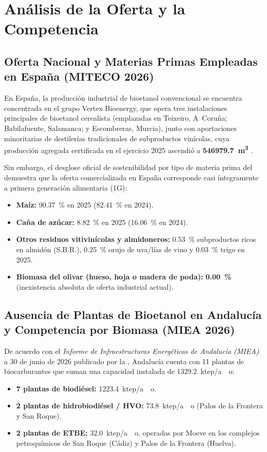 \documentclass{report}
\begin{document}
\chapter{Análisis de la Oferta y la Competencia}

\section{Oferta Nacional y Materias Primas Empleadas en España (MITECO 2026)}
En España, la producción industrial de bioetanol convencional se encuentra concentrada en el grupo Vertex Bioenergy, que opera tres instalaciones principales de bioetanol cerealista (emplazadas en Teixeiro, A~Coruña; Babilafuente, Salamanca; y Escombreras, Murcia), junto con aportaciones minoritarias de destilerías tradicionales de subproductos vinícolas, cuya producción agregada certificada en el ejercicio 2025 ascendió a \textbf{\SI{546979.7}{\cubic\meter}} \autocite{MITECO2026}.

Sin embargo, el desglose oficial de sostenibilidad por tipo de materia prima del \textcite{MITECO2026} demuestra que la oferta comercializada en España corresponde casi íntegramente a primera generación alimentaria (1G):
\begin{itemize}
    \item \textbf{Maíz:} \SI{90.37}{\percent} en 2025 (\SI{82.41}{\percent} en 2024).
    \item \textbf{Caña de azúcar:} \SI{8.82}{\percent} en 2025 (\SI{16.06}{\percent} en 2024).
    \item \textbf{Otros residuos vitivinícolas y almidoneros:} \SI{0.53}{\percent} subproductos ricos en almidón (S.B.R.), \SI{0.25}{\percent} orujo de uva/lías de vino y \SI{0.03}{\percent} trigo en 2025.
    \item \textbf{Biomasa del olivar (hueso, hoja o madera de poda):} \textbf{\SI{0.00}{\percent}} (inexistencia absoluta de oferta industrial actual).
\end{itemize}

\section{Ausencia de Plantas de Bioetanol en Andalucía y Competencia por Biomasa (MIEA 2026)}
De acuerdo con el \textit{Informe de Infraestructuras Energéticas de Andalucía (MIEA)} a 30 de junio de 2026 publicado por la \textcite[Sección~7 y Anexo~6]{AAE2026}, Andalucía cuenta con 11 plantas de biocarburantes que suman una capacidad instalada de \SI{1329.2}{ktep/ao}:
\begin{itemize}
    \item \textbf{7 plantas de biodiésel:} \SI{1223.4}{ktep/ao}.
    \item \textbf{2 plantas de hidrobiodiésel / HVO:} \SI{73.8}{ktep/ao} (Palos de la Frontera y San Roque).
    \item \textbf{2 plantas de ETBE:} \SI{32.0}{ktep/ao}, operadas por Moeve en los complejos petroquímicos de San Roque (Cádiz) y Palos de la Frontera (Huelva).
\end{itemize}
\end{document}
